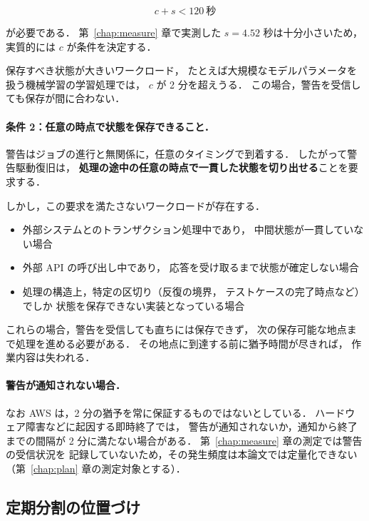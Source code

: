 \documentclass[11pt,a4paper]{ltjsreport}
\begin{document}
\begin{equation}
c + s < 120\ \text{秒}
\label{eq:warning_cond}
\end{equation}

が必要である．
第~\ref{chap:measure} 章で実測した $s = 4.52$ 秒は十分小さいため，
実質的には $c$ が条件を決定する．

保存すべき状態が大きいワークロード，
たとえば大規模なモデルパラメータを扱う機械学習の学習処理では，
$c$ が 2 分を超えうる．
この場合，警告を受信しても保存が間に合わない．

\paragraph{条件 2：任意の時点で状態を保存できること．}
警告はジョブの進行と無関係に，任意のタイミングで到着する．
したがって警告駆動復旧は，
\textbf{処理の途中の任意の時点で一貫した状態を切り出せる}ことを要求する．

しかし，この要求を満たさないワークロードが存在する．

\begin{itemize}
  \item 外部システムとのトランザクション処理中であり，
        中間状態が一貫していない場合
  \item 外部 API の呼び出し中であり，
        応答を受け取るまで状態が確定しない場合
  \item 処理の構造上，特定の区切り（反復の境界，
        テストケースの完了時点など）でしか
        状態を保存できない実装となっている場合
\end{itemize}

これらの場合，警告を受信しても直ちには保存できず，
次の保存可能な地点まで処理を進める必要がある．
その地点に到達する前に猶予時間が尽きれば，
作業内容は失われる．

\paragraph{警告が通知されない場合．}
なお AWS は，2 分の猶予を常に保証するものではないとしている．
ハードウェア障害などに起因する即時終了では，
警告が通知されないか，通知から終了までの間隔が
2 分に満たない場合がある．
第~\ref{chap:measure} 章の測定では警告の受信状況を
記録していないため，その発生頻度は本論文では定量化できない
（第~\ref{chap:plan} 章の測定対象とする）．

\subsection{定期分割の位置づけ}
\label{sec:split_role}
\end{document}
